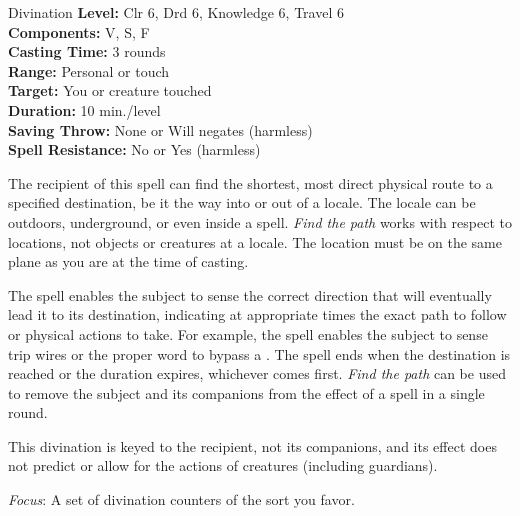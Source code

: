{Divination}
{
	\textbf{Level:}
	Clr 6, Drd 6, Knowledge 6, Travel 6\\
	\textbf{Components:}
	V, S, F\\
	\textbf{Casting Time:}
	3 rounds\\
	\textbf{Range:}
	Personal or touch\\
	\textbf{Target:}
	You or creature touched\\
	\textbf{Duration:}
	10 min./level\\
	\textbf{Saving Throw:}
	None or Will negates (harmless)\\
	\textbf{Spell Resistance:}
	No or Yes (harmless)\\
}
{
	The recipient of this spell can find the shortest, most direct physical route to a specified destination, be it the way into or out of a locale. The locale can be outdoors, underground, or even inside a  spell. \emph{Find the path} works with respect to locations, not objects or creatures at a locale. The location must be on the same plane as you are at the time of casting.

	The spell enables the subject to sense the correct direction that will eventually lead it to its destination, indicating at appropriate times the exact path to follow or physical actions to take. For example, the spell enables the subject to sense trip wires or the proper word to bypass a . The spell ends when the destination is reached or the duration expires, whichever comes first. \emph{Find the path} can be used to remove the subject and its companions from the effect of a  spell in a single round.

	This divination is keyed to the recipient, not its companions, and its effect does not predict or allow for the actions of creatures (including guardians).

	\textit{Focus}:
	A set of divination counters of the sort you favor.

}
